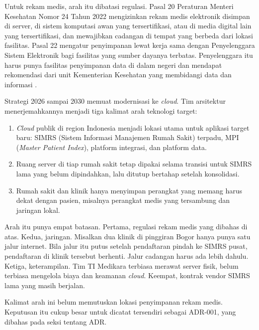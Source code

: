 Untuk rekam medis, arah itu dibatasi regulasi. Pasal 20 Peraturan Menteri
Kesehatan Nomor 24 Tahun 2022 mengizinkan rekam medis elektronik disimpan di
server, di sistem komputasi awan yang tersertifikasi, atau di media digital
lain yang tersertifikasi, dan mewajibkan cadangan di tempat yang berbeda dari
lokasi fasilitas. Pasal 22 mengatur penyimpanan lewat kerja sama dengan
Penyelenggara Sistem Elektronik bagi fasilitas yang sumber dayanya terbatas.
Penyelenggara itu harus punya fasilitas penyimpanan data di dalam negeri dan
mendapat rekomendasi dari unit Kementerian Kesehatan yang membidangi data dan
informasi \cite{permenkes24-2022}.

\begin{kasus}[title={Kasus Medikara Health: Arah Modernisasi ke Cloud dan Batasannya}]
Strategi 2026 sampai 2030 memuat modernisasi ke \textit{cloud}. Tim arsitektur
menerjemahkannya menjadi tiga kalimat arah teknologi target:

\begin{enumerate}
  \item \textit{Cloud} publik di region Indonesia menjadi lokasi utama untuk
        aplikasi target baru: SIMRS (Sistem Informasi Manajemen Rumah Sakit)
        terpadu, MPI (\textit{Master Patient Index}), platform integrasi, dan
        platform data.
  \item Ruang server di tiap rumah sakit tetap dipakai selama transisi untuk SIMRS
        lama yang belum dipindahkan, lalu ditutup bertahap setelah konsolidasi.
  \item Rumah sakit dan klinik hanya menyimpan perangkat yang memang harus
        dekat dengan pasien, misalnya perangkat medis yang tersambung dan
        jaringan lokal.
\end{enumerate}

Arah itu punya empat batasan. Pertama, regulasi rekam medis yang dibahas di
atas. Kedua, jaringan. Misalkan dua klinik di pinggiran Bogor hanya punya satu
jalur internet. Bila jalur itu putus setelah pendaftaran pindah ke SIMRS
pusat, pendaftaran di klinik tersebut berhenti. Jalur cadangan harus ada
lebih dahulu. Ketiga, keterampilan. Tim TI Medikara terbiasa merawat server
fisik, belum terbiasa mengelola biaya dan keamanan \textit{cloud}. Keempat,
kontrak vendor SIMRS lama yang masih berjalan.

Kalimat arah ini belum memutuskan lokasi penyimpanan rekam medis. Keputusan
itu cukup besar untuk dicatat tersendiri sebagai ADR-001, yang dibahas pada
seksi tentang ADR.
\end{kasus}

